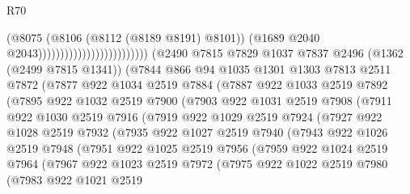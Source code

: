 \begin{lexlean}{R70}
\begin{coremodule}
                                                    (@8075
                                                      (@8106 (@8112 (@8189 @8191) @8101))
                                                      (@1689 @2040 @2043)))))))))))))))))))))))))
      (@2490
        @7815
        @7829
        @1037
        @7837
        @2496
        (@1362 (@2499 @7815 @1341))
        (@7844
          @866
          @94
          @1035
          @1301
          @1303
          @7813
          @2511
          @7872
          (@7877
            @922
            @1034
            @2519
            @7884
            (@7887
              @922
              @1033
              @2519
              @7892
              (@7895
                @922
                @1032
                @2519
                @7900
                (@7903
                  @922
                  @1031
                  @2519
                  @7908
                  (@7911
                    @922
                    @1030
                    @2519
                    @7916
                    (@7919
                      @922
                      @1029
                      @2519
                      @7924
                      (@7927
                        @922
                        @1028
                        @2519
                        @7932
                        (@7935
                          @922
                          @1027
                          @2519
                          @7940
                          (@7943
                            @922
                            @1026
                            @2519
                            @7948
                            (@7951
                              @922
                              @1025
                              @2519
                              @7956
                              (@7959
                                @922
                                @1024
                                @2519
                                @7964
                                (@7967
                                  @922
                                  @1023
                                  @2519
                                  @7972
                                  (@7975
                                    @922
                                    @1022
                                    @2519
                                    @7980
                                    (@7983
                                      @922
                                      @1021
                                      @2519

\end{coremodule}
\end{lexlean}
